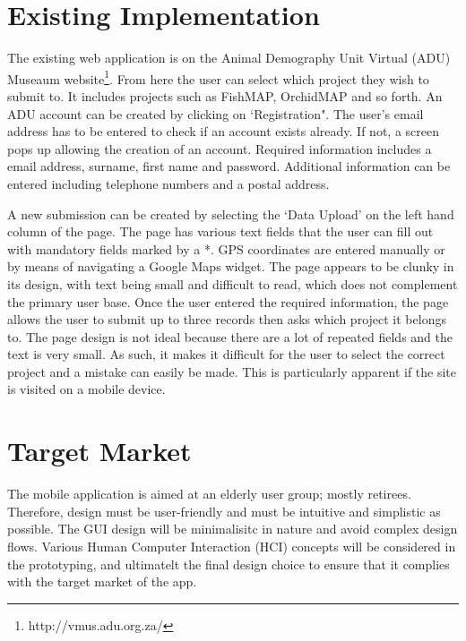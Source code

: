 \documentclass[12pt,a4paper,oneside]{article}
\begin{document}
\section{Existing Implementation}
  \begin{spacing}{1.4}
    The existing web application is on the Animal Demography Unit Virtual (ADU) Museaum website\footnote{http://vmus.adu.org.za/}.
    From here the user can select which project they wish to submit to. It includes projects such as FishMAP, OrchidMAP and so forth.
    An ADU account can be created by clicking on `Registration". The user's email address has to be entered to check if an account exists
    already. If not, a screen pops up allowing the creation of an account. Required information includes a email address, surname, first name and
    password. Additional information can be entered including telephone numbers and a postal address.

    A new submission can be created by selecting the `Data Upload' on the left hand column of the page. The page has various text fields that the user can fill out with mandatory
    fields marked by a *. GPS coordinates are entered manually or by means of navigating a Google Maps widget. The page appears to be clunky in its design, with text being small and
    difficult to read, which does not complement the primary user base. Once the user entered the required information, the page allows the user to submit up to three records
    then asks which project it belongs to. The page design is not ideal because there are a lot of repeated fields and the text is very small. As such, it makes it difficult for the
    user to select the correct project and a mistake can easily be made. This is particularly apparent if the site is visited on a mobile device.
  \end{spacing}

\section{Target Market}
  \begin{spacing}{1.4}
    The mobile application is aimed at an elderly user group; mostly retirees. Therefore, design must be user-friendly and must be intuitive and simplistic as possible. The GUI design will be minimalisitc in nature and avoid complex design flows. Various Human Computer Interaction (HCI) concepts will be considered in the prototyping, and ultimatelt the final design choice to ensure that it complies with the target market of the app.
  \end{spacing}
\end{document}

